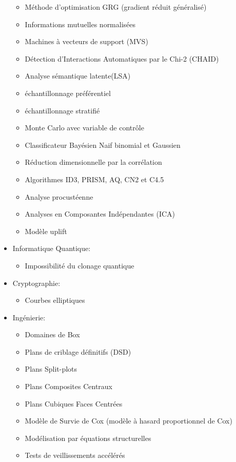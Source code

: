 \begin{itemize}
\begin{itemize}
				\item M\'ethode d'optimisation GRG (gradient r\'eduit g\'en\'eralis\'e)
				\item Informations mutuelles normalis\'ees
				\item Machines à vecteurs de support (MVS)
				\item D\'etection d'Interactions Automatiques par le Chi-2 (CHAID)
				\item Analyse s\'emantique latente(LSA)
				\item \'echantillonnage pr\'ef\'erentiel 
				\item \'echantillonnage stratifi\'e
				\item Monte Carlo avec variable de contrôle
				\item Classificateur Bay\'esien Naif binomial et Gaussien
				\item R\'eduction dimensionnelle par la corr\'elation
				\item Algorithmes ID3, PRISM, AQ, CN2 et C4.5
				\item Analyse procust\'eenne
				\item Analyses en Composantes Ind\'ependantes (ICA)
				\item Modèle uplift
			\end{itemize}
		\item Informatique Quantique: 
			\begin{itemize}
				\item Impossibilit\'e du clonage quantique
			\end{itemize}
		\item Cryptographie: 
			\begin{itemize}
				\item Courbes elliptiques
			\end{itemize}	
		\item Ing\'enierie:
			\begin{itemize}
				\item Domaines de Box
				\item Plans de criblage d\'efinitifs (DSD)
				\item Plans Split-plots
				\item Plans Composites Centraux
				\item Plans Cubiques Faces Centr\'ees
				\item Modèle de Survie de Cox (modèle à hasard proportionnel de Cox)
				\item Mod\'elisation par \'equations structurelles				
				\item Tests de veillissements acc\'el\'er\'es

\end{itemize}
\end{itemize}
